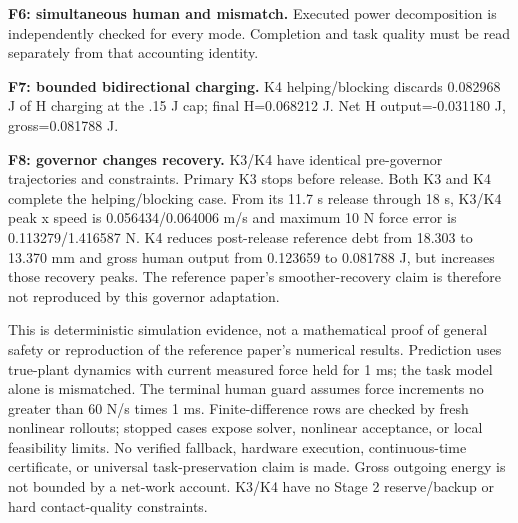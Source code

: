 \documentclass[10pt,letterpaper]{article}
\begin{document}
\textbf{F6: simultaneous human and mismatch.} Executed power decomposition is independently checked for every mode. Completion and task quality must be read separately from that accounting identity.\par
\textbf{F7: bounded bidirectional charging.} K4 helping/blocking discards 0.082968 J of H charging at the .15 J cap; final H=0.068212 J. Net H output=-0.031180 J, gross=0.081788 J.\par
\textbf{F8: governor changes recovery.} K3/K4 have identical pre-governor trajectories and constraints. Primary K3 stops before release. Both K3 and K4 complete the helping/blocking case. From its 11.7 s release through 18 s, K3/K4 peak x speed is 0.056434/0.064006 m/s and maximum 10 N force error is 0.113279/1.416587 N. K4 reduces post-release reference debt from 18.303 to 13.370 mm and gross human output from 0.123659 to 0.081788 J, but increases those recovery peaks. The reference paper's smoother-recovery claim is therefore not reproduced by this governor adaptation.\par
This is deterministic simulation evidence, not a mathematical proof of general safety or reproduction of the reference paper's numerical results. Prediction uses true-plant dynamics with current measured force held for 1 ms; the task model alone is mismatched. The terminal human guard assumes force increments no greater than 60 N/s times 1 ms. Finite-difference rows are checked by fresh nonlinear rollouts; stopped cases expose solver, nonlinear acceptance, or local feasibility limits. No verified fallback, hardware execution, continuous-time certificate, or universal task-preservation claim is made. Gross outgoing energy is not bounded by a net-work account. K3/K4 have no Stage 2 reserve/backup or hard contact-quality constraints.
\end{document}
